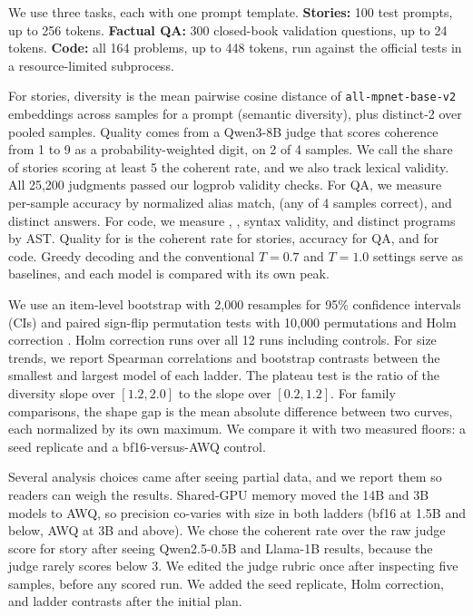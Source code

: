 We use three tasks, each with one prompt template. {\bf Stories:} 100 \writingprompts \citep{fan2018hierarchical} test prompts, up to 256 tokens. {\bf Factual QA:} 300 closed-book \triviaqa \citep{joshi2017triviaqa} validation questions, up to 24 tokens. {\bf Code:} all 164 \humaneval \citep{chen2021codex} problems, up to 448 tokens, run against the official tests in a resource-limited subprocess.

For stories, diversity is the mean pairwise cosine distance of \texttt{all-mpnet-base-v2} embeddings across samples for a prompt (semantic diversity), plus distinct-2 over pooled samples. Quality comes from a Qwen3-8B judge that scores coherence from 1 to 9 as a probability-weighted digit, on 2 of 4 samples. We call the share of stories scoring at least 5 the coherent rate, and we also track lexical validity. All 25,200 judgments passed our logprob validity checks. For QA, we measure per-sample accuracy by normalized alias match, \coverfour (any of 4 samples correct), and distinct answers. For code, we measure \passone, \passfour, syntax validity, and distinct programs by AST. Quality for \Tu is the coherent rate for stories, accuracy for QA, and \passone for code. Greedy decoding and the conventional $T = 0.7$ and $T = 1.0$ settings serve as baselines, and each model is compared with its own peak.

We use an item-level bootstrap with 2,000 resamples for 95\% confidence intervals (CIs) and paired sign-flip permutation tests with 10,000 permutations and Holm correction \citep{holm1979simple}. Holm correction runs over all 12 runs including controls. For size trends, we report Spearman correlations and bootstrap contrasts between the smallest and largest model of each ladder. The plateau test is the ratio of the diversity slope over $[1.2, 2.0]$ to the slope over $[0.2, 1.2]$. For family comparisons, the shape gap is the mean absolute difference between two curves, each normalized by its own maximum. We compare it with two measured floors: a seed replicate and a bf16-versus-AWQ control.

Several analysis choices came after seeing partial data, and we report them so readers can weigh the results. Shared-GPU memory moved the 14B and 3B models to AWQ, so precision co-varies with size in both ladders (bf16 at 1.5B and below, AWQ at 3B and above). We chose the coherent rate over the raw judge score for story \Tu after seeing Qwen2.5-0.5B and Llama-1B results, because the judge rarely scores below 3. We edited the judge rubric once after inspecting five samples, before any scored run. We added the seed replicate, Holm correction, and ladder contrasts after the initial plan.
